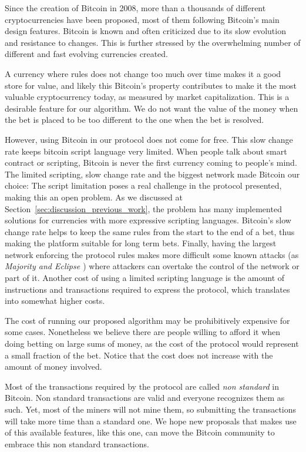 Since the creation of Bitcoin in 2008, more than a thousands of different
  cryptocurrencies have been proposed, most of them following Bitcoin's main
  design features.
Bitcoin is known and often criticized due to its slow evolution and resistance
  to changes.
This is further stressed by the overwhelming number of different and fast
  evolving currencies created.

A currency where rules does not change too much over time makes it a good store
  for value, and likely this Bitcoin's property contributes to make it the
  most valuable cryptocurrency today, as measured by market capitalization.
This is a desirable feature for our algorithm.
We do not want the value of the money when the bet is placed to be too different
  to the one when the bet
  is resolved.

However, using Bitcoin in our protocol does not come for free.
This slow change rate keeps bitcoin script language very limited.
When people talk about smart contract or scripting, Bitcoin is never the first
  currency coming to people's mind.
The limited scripting, slow change rate and the biggest network made Bitcoin our
  choice:
The script limitation poses a real challenge in the protocol presented, making
  this an open problem.
As we discussed at Section~\ref{sec:discussion_previous_work}, the problem has
  many implemented solutions for currencies with more expressive scripting
  languages.
Bitcoin's slow change rate helps to keep the same rules from the start to the
  end of a bet, thus making the platform suitable for long term bets.
Finally, having the largest network enforcing the protocol rules makes more
  difficult some known attacks (as \emph{Majority and Eclipse
  \cite{heilman2015eclipse}}) where attackers can overtake the control of the
  network or part of it.
Another cost of using a limited scripting language is the amount of instructions
  and transactions required to express the protocol, which translates into
  somewhat higher costs.

The cost of running our proposed algorithm may be prohibitively expensive for
  some cases.
Nonetheless we believe there are people willing to afford it when doing betting
  on large sums of money, as the cost of the protocol would represent a small
  fraction of the bet.
Notice that the cost does not increase with the amount of money involved.

Most of the transactions required by the protocol are called
  \textit{non standard} in Bitcoin.
Non standard transactions are valid and everyone recognizes them as such.
Yet, most of the miners will not mine them, so submitting the transactions
  will take more time than a standard one.
We hope new proposals that makes use of this available features, like this one,
  can move the Bitcoin community to embrace this non standard transactions.

